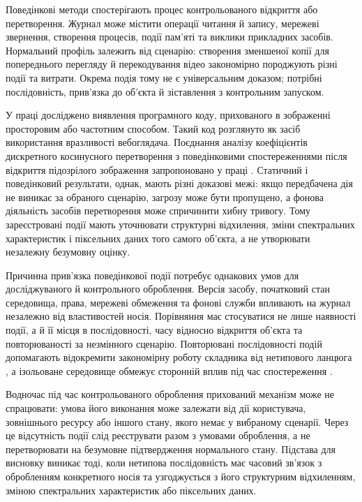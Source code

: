 Поведінкові методи спостерігають процес контрольованого відкриття або перетворення. Журнал може містити операції читання й запису, мережеві звернення, створення процесів, події пам’яті та виклики прикладних засобів. Нормальний профіль залежить від сценарію: створення зменшеної копії для попереднього перегляду й перекодування відео закономірно породжують різні події та витрати. Окрема подія тому не є універсальним доказом; потрібні послідовність, прив’язка до об’єкта й зіставлення з контрольним запуском.

У праці \cite{iglesias2023driveby} досліджено виявлення програмного коду, прихованого в зображенні просторовим або частотним способом. Такий код розглянуто як засіб використання вразливості вебоглядача. Поєднання аналізу коефіцієнтів дискретного косинусного перетворення з поведінковими спостереженнями після відкриття підозрілого зображення запропоновано у праці \cite{denysiuk2025commands}. Статичний і поведінковий результати, однак, мають різні доказові межі: якщо передбачена дія не виникає за обраного сценарію, загрозу може бути пропущено, а фонова діяльність засобів перетворення може спричинити хибну тривогу. Тому зареєстровані події мають уточнювати структурні відхилення, зміни спектральних характеристик і піксельних даних того самого об’єкта, а не утворювати незалежну безумовну оцінку.

Причинна прив’язка поведінкової події потребує однакових умов для досліджуваного й контрольного оброблення. Версія засобу, початковий стан середовища, права, мережеві обмеження та фонові служби впливають на журнал незалежно від властивостей носія. Порівняння має стосуватися не лише наявності події, а й її місця в послідовності, часу відносно відкриття об’єкта та повторюваності за незмінного сценарію. Повторювані послідовності подій допомагають відокремити закономірну роботу складника від нетипового ланцюга \cite{denysiuk2024behavior}, а ізольоване середовище обмежує сторонній вплив під час спостереження \cite{abbadini2023sandboxing}.

Водночас під час контрольованого оброблення прихований механізм може не спрацювати: умова його виконання може залежати від дії користувача, зовнішнього ресурсу або іншого стану, якого немає у вибраному сценарії. Через це відсутність події слід реєструвати разом з умовами оброблення, а не перетворювати на безумовне підтвердження нормального стану. Підстава для висновку виникає тоді, коли нетипова послідовність має часовий зв’язок з обробленням конкретного носія та узгоджується з його структурним відхиленням, зміною спектральних характеристик або піксельних даних.

